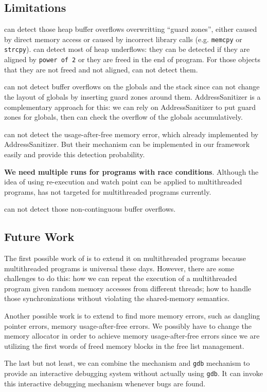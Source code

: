\subsection{Limitations}
\doubletake{} can detect those heap buffer overflows overwritting ``guard zones'', 
either caused by direct memory access or caused by
incorrect library calls (e.g. \texttt{memcpy} or \texttt{strcpy}). 
\doubletake{} can detect most of heap underflows: they can be detected if they are
aligned by \texttt{power of 2} or they are freed in the end of program. 
For those objects that they are not freed and not aligned, \doubletake{} can not detect them.
 
\doubletake{} can not detect buffer overflows on the globals and the stack 
since \doubletake{} can not change the layout of globals by inserting guard zones around them.
AddressSanitizer is a complementary approach for this: we can rely on AddressSanitizer 
to put guard zones for globals, then \doubletake{} can check the overflow of the globals accumulatively. 

\doubletake{} can not detect the usage-after-free memory error, which already implemented by 
AddressSanitizer. But their mechanism can be implemented in our framework easily and provide
this detection probability. 

\textbf{We need multiple runs for programs with race conditions}.
Although the idea of using re-execution and watch point can be applied to multithreaded programs,
\doubletake{} has not targeted for multithreaded programs currently. 

\doubletake{} can not detect those non-continguous buffer overflows. 
\subsection{Future Work} 
The first possible work of \doubletake{} is to extend it on multithreaded programs because
multithreaded programs is universal these days. 
However, there are some challenges to do this: how we can repeat the execution of 
a multithreaded program given random memory accesses from different threads;
how to handle those synchronizations without violating the shared-memory
semantics. 

Another possible work is to extend \doubletake{} to find more memory errors, such as dangling pointer 
errors, memory usage-after-free errors.
We possibly have to change the memory allocator in order to achieve memory usage-after-free errors
since we are utilizing the first words of freed memory blocks in the free list management. 

The last but not least, we can combine the \doubletake{} mechanism and \texttt{gdb} mechanism
to provide an interactive debugging system without actually using \texttt{gdb}. It can invoke this 
interactive debugging mechanism whenever bugs are found. 
